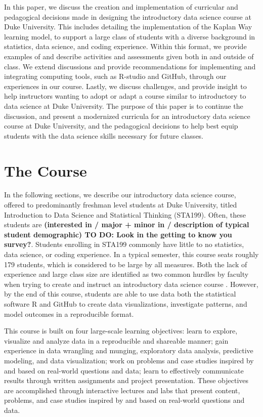 \documentclass[
  12pt]{article}
\begin{document}
In this paper, we discuss the creation and implementation of curricular
and pedagogical decisions made in designing the introductory data
science course at Duke University. This includes detailing the
implementation of the Kaplan Way learning model, to support a large
class of students with a diverse background in statistics, data science,
and coding experience. Within this format, we provide examples of and
describe activities and assessments given both in and outside of class.
We extend discussions and provide recommendations for implementing and
integrating computing tools, such as R-studio and GitHub, through our
experiences in our course. Lastly, we discuss challenges, and provide
insight to help instructors wanting to adopt or adapt a course similar
to introductory to data science at Duke University. The purpose of this
paper is to continue the discussion, and present a modernized curricula
for an introductory data science course at Duke University, and the
pedagogical decisions to help best equip students with the data science
skills necessary for future classes.

\hypertarget{sec-course}{%
\section{The Course}\label{sec-course}}

In the following sections, we describe our introductory data science
course, offered to predominantly freshman level students at Duke
University, titled Introduction to Data Science and Statistical Thinking
(STA199). Often, these students are \textbf{(interested in / major +
minor in / description of typical student demographic) TO DO: Look in
the getting to know you survey?}. Students enrolling in STA199 commonly
have little to no statistics, data science, or coding experience. In a
typical semester, this course seats roughly 179 students, which is
considered to be large by all measures. Both the lack of experience and
large class size are identified as two common hurdles by faculty when
trying to create and instruct an introductory data science course
\citep{Schwab2020, Kok_2008}. However, by the end of this course,
students are able to use data both the statistical software R and GitHub
to create data visualizations, investigate patterns, and model outcomes
in a reproducible format.

This course is built on four large-scale learning objectives: learn to
explore, visualize and analyze data in a reproducible and shareable
manner; gain experience in data wrangling and munging, exploratory data
analysis, predictive modeling, and data visualization; work on problems
and case studies inspired by and based on real-world questions and data;
learn to effectively communicate results through written assignments and
project presentation. These objectives are accomplished through
interactive lectures and labs that present content, problems, and case
studies inspired by and based on real-world questions and data.
\end{document}
